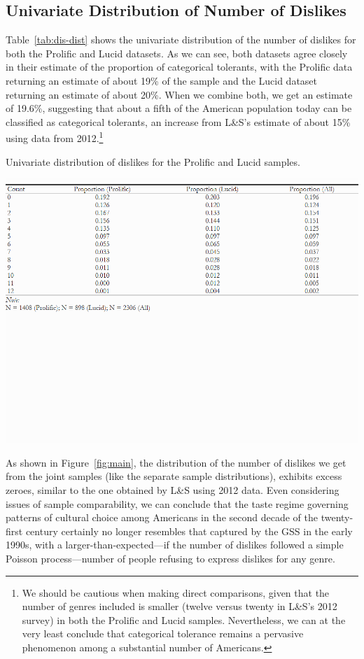 \documentclass[12pt]{article}
\begin{document}
\subsection*{Univariate Distribution of Number of Dislikes}
Table~\ref{tab:dis-dist} shows the univariate distribution of the number of dislikes for both the Prolific and Lucid datasets. As we can see, both datasets agree closely in their estimate of the proportion of categorical tolerants, with the Prolific data returning an estimate of about 19\% of the sample and the Lucid dataset returning an estimate of about 20\%. When we combine both, we get an estimate of 19.6\%, suggesting that about a fifth of the American population today can be classified as categorical tolerants, an increase from L\&S's estimate of about 15\% using data from 2012.\footnote{We should be cautious when making direct comparisons, given that the number of genres included is smaller (twelve versus twenty in L\&S's 2012 survey) in both the Prolific and Lucid samples. Nevertheless, we can at the very least conclude that categorical tolerance remains a pervasive phenomenon among a substantial number of Americans.} 

\begin{table}[ht!]
    \caption{Univariate distribution of dislikes for the Prolific and Lucid samples.}
    \includegraphics[trim={0 9cm 0 0},clip, width=1.0\textwidth]{Tabs/desc-tab-dislike-dist.png}
    \label{tab:dis-dist}
\end{table}

As shown in Figure~\ref{fig:main}, the distribution of the number of dislikes we get from the joint samples (like the separate sample distributions), exhibits excess zeroes, similar to the one obtained by L\&S using 2012 data. Even considering issues of sample comparability, we can conclude that the taste regime governing patterns of cultural choice among Americans in the second decade of the twenty-first century certainly no longer resembles that captured by the GSS in the early 1990s, with a larger-than-expected---if the number of dislikes followed a simple Poisson process---number of people refusing to express dislikes for any genre. 
\end{document}
